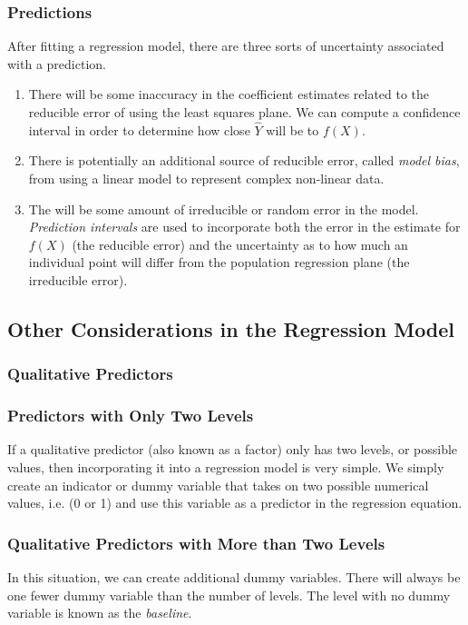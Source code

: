 \documentclass{article}
\begin{document}
\subsubsection*{Predictions}
After fitting a regression model, there are three sorts of uncertainty associated with a prediction.
\begin{enumerate}
    \item There will be some inaccuracy in the coefficient estimates related to the reducible error of using the least squares plane. We can compute a confidence interval in order to determine how close $\hat Y$ will be to $f(X)$.
    \item There is potentially an additional source of reducible error, called \textit{model bias}, from using a linear model to represent complex non-linear data.
    \item The will be some amount of irreducible or random error in the model.  \textit{Prediction intervals} are used to incorporate both the error in the estimate for $f(X)$ (the reducible error) and the uncertainty as to how much an individual point will differ from the population regression plane (the irreducible error). 
\end{enumerate}


\subsection{Other Considerations in the Regression Model}
\subsubsection{Qualitative Predictors}
\subsubsection*{Predictors with Only Two Levels}
If a qualitative predictor (also known as a factor) only has two levels, or possible values, then incorporating it into a regression model is very simple. We simply create an indicator or dummy variable that takes on two possible numerical values, i.e. (0 or 1) and use this variable as a predictor in the regression equation.

\subsubsection*{Qualitative Predictors with More than Two Levels}
In this situation, we can create additional dummy variables. There will always be one fewer dummy variable than the number of levels. The level with no dummy variable is known as the \textit{baseline}.
\end{document}
